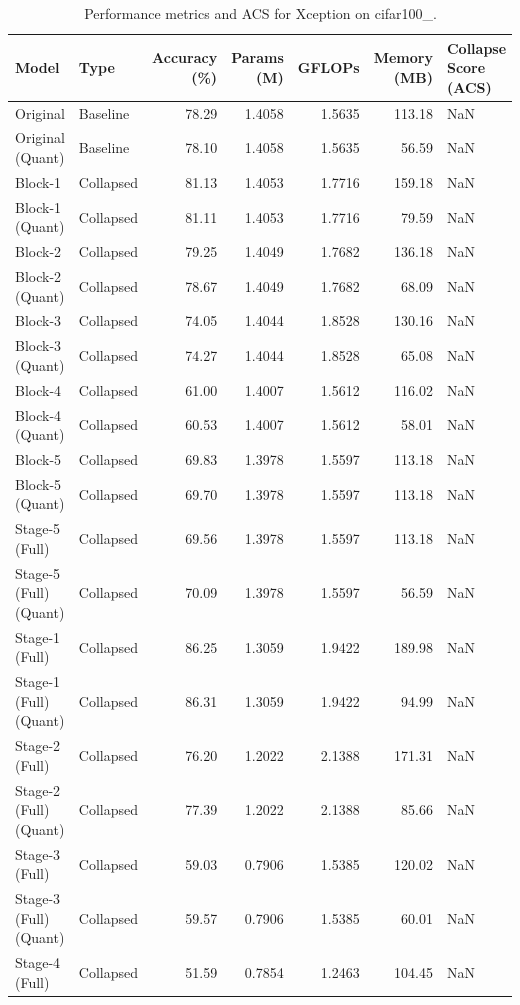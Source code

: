 \begin{table}
\caption{Performance metrics and ACS for Xception on cifar100_.}
\label{tab:Xception_cifar100_}
\begin{tabular}{llrrrrl}
\toprule
Model & Type & Accuracy (\%) & Params (M) & GFLOPs & Memory (MB) & Collapse Score (ACS) \\
\midrule
Original & Baseline & 78.29 & 1.4058 & 1.5635 & 113.18 & NaN \\
Original
(Quant) & Baseline & 78.10 & 1.4058 & 1.5635 & 56.59 & NaN \\
Block-1 & Collapsed & 81.13 & 1.4053 & 1.7716 & 159.18 & NaN \\
Block-1
(Quant) & Collapsed & 81.11 & 1.4053 & 1.7716 & 79.59 & NaN \\
Block-2 & Collapsed & 79.25 & 1.4049 & 1.7682 & 136.18 & NaN \\
Block-2
(Quant) & Collapsed & 78.67 & 1.4049 & 1.7682 & 68.09 & NaN \\
Block-3 & Collapsed & 74.05 & 1.4044 & 1.8528 & 130.16 & NaN \\
Block-3
(Quant) & Collapsed & 74.27 & 1.4044 & 1.8528 & 65.08 & NaN \\
Block-4 & Collapsed & 61.00 & 1.4007 & 1.5612 & 116.02 & NaN \\
Block-4
(Quant) & Collapsed & 60.53 & 1.4007 & 1.5612 & 58.01 & NaN \\
Block-5 & Collapsed & 69.83 & 1.3978 & 1.5597 & 113.18 & NaN \\
Block-5
(Quant) & Collapsed & 69.70 & 1.3978 & 1.5597 & 113.18 & NaN \\
Stage-5 (Full) & Collapsed & 69.56 & 1.3978 & 1.5597 & 113.18 & NaN \\
Stage-5 (Full)
(Quant) & Collapsed & 70.09 & 1.3978 & 1.5597 & 56.59 & NaN \\
Stage-1 (Full) & Collapsed & 86.25 & 1.3059 & 1.9422 & 189.98 & NaN \\
Stage-1 (Full)
(Quant) & Collapsed & 86.31 & 1.3059 & 1.9422 & 94.99 & NaN \\
Stage-2 (Full) & Collapsed & 76.20 & 1.2022 & 2.1388 & 171.31 & NaN \\
Stage-2 (Full)
(Quant) & Collapsed & 77.39 & 1.2022 & 2.1388 & 85.66 & NaN \\
Stage-3 (Full) & Collapsed & 59.03 & 0.7906 & 1.5385 & 120.02 & NaN \\
Stage-3 (Full)
(Quant) & Collapsed & 59.57 & 0.7906 & 1.5385 & 60.01 & NaN \\
Stage-4 (Full) & Collapsed & 51.59 & 0.7854 & 1.2463 & 104.45 & NaN \\

\end{tabular}
\end{table}
